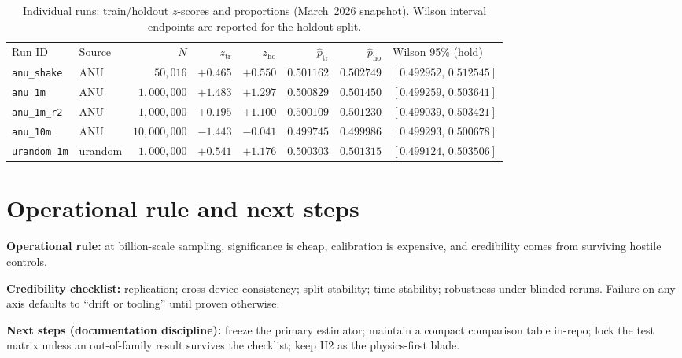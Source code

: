 \documentclass[reprint,amsmath,amssymb,aps,showkeys]{revtex4-2}
\begin{document}
\begin{table}[t]
\caption{Individual runs: train/holdout $z$-scores and proportions (March~2026 snapshot). Wilson interval endpoints are reported for the holdout split.}
\label{tab:runs}
{\footnotesize\setlength{\tabcolsep}{3pt}%
\begin{ruledtabular}
\begin{tabular}{llrrrrrp{1.55in}}
Run ID & Source & $N$ & $z_{\mathrm{tr}}$ & $z_{\mathrm{ho}}$ & $\hat p_{\mathrm{tr}}$ & $\hat p_{\mathrm{ho}}$ & Wilson 95\% (hold) \\
\colrule
\texttt{anu\_shake} & ANU & $50{,}016$ & $+0.465$ & $+0.550$ & $0.501162$ & $0.502749$ & $[0.492952,\,0.512545]$ \\
\texttt{anu\_1m} & ANU & $1{,}000{,}000$ & $+1.483$ & $+1.297$ & $0.500829$ & $0.501450$ & $[0.499259,\,0.503641]$ \\
\texttt{anu\_1m\_r2} & ANU & $1{,}000{,}000$ & $+0.195$ & $+1.100$ & $0.500109$ & $0.501230$ & $[0.499039,\,0.503421]$ \\
\texttt{anu\_10m} & ANU & $10{,}000{,}000$ & $-1.443$ & $-0.041$ & $0.499745$ & $0.499986$ & $[0.499293,\,0.500678]$ \\
\texttt{urandom\_1m} & urandom & $1{,}000{,}000$ & $+0.541$ & $+1.176$ & $0.500303$ & $0.501315$ & $[0.499124,\,0.503506]$ \\
\end{tabular}
\end{ruledtabular}
}
\end{table}

\section{Operational rule and next steps}
\textbf{Operational rule:} at billion-scale sampling, significance is cheap, calibration is expensive, and credibility comes from surviving hostile controls.

\textbf{Credibility checklist:} replication; cross-device consistency; split stability; time stability; robustness under blinded reruns. Failure on any axis defaults to ``drift or tooling'' until proven otherwise.

\textbf{Next steps (documentation discipline):} freeze the primary estimator; maintain a compact comparison table in-repo; lock the test matrix unless an out-of-family result survives the checklist; keep H2 as the physics-first blade.
\end{document}
